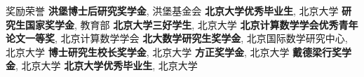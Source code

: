 %
\begin{rubric}{\songti 奖励荣誉}
%
\entry*[2023.07] \textbf{洪堡博士后研究奖学金}, 洪堡基金会
%
\entry*[2021.07] \textbf{北京大学优秀毕业生}, 北京大学
%
\entry*[2020.12] \textbf{研究生国家奖学金}, 教育部
%
\entry*[2020.10] \textbf{北京大学三好学生}, 北京大学
%
\entry*[2020.08] \textbf{北京计算数学学会优秀青年论文一等奖}, 北京计算数学学会
%
\entry*[2019--2020] \textbf{北大数学研究生奖学金}, 北京国际数学研究中心, 北京大学
%
\entry*[2018--2020] \textbf{博士研究生校长奖学金}, 北京大学
%
\entry*[2019.09] \textbf{方正奖学金}, 北京大学
%
\entry*[2017.09] \textbf{戴德梁行奖学金}, 北京大学
%
\entry*[2016.07] \textbf{北京大学优秀毕业生}, 北京大学
\end{rubric}

